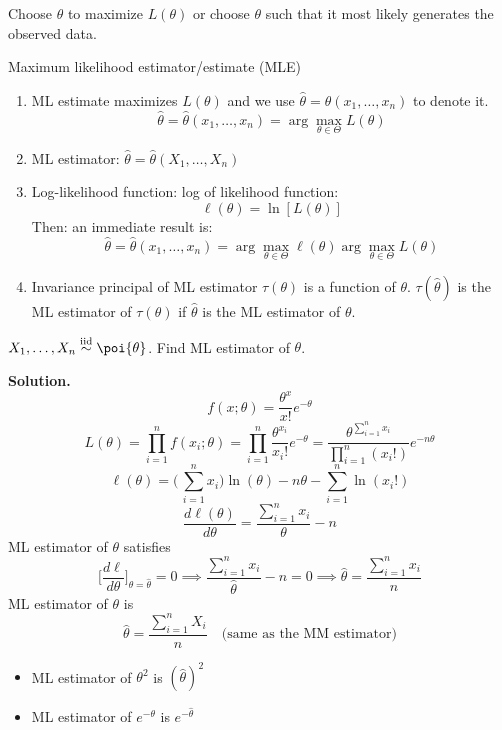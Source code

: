 Choose $ \theta $ to maximize $ L(\theta) $ or choose
$ \theta $ such that it most likely generates the observed data.

Maximum likelihood estimator/estimate (MLE)
\begin{enumerate}
    \item ML estimate maximizes $ L(\theta) $ and we use
          $ \hat{\theta}=\hat{\theta}(x_1,\ldots,x_n) $ to denote it.
          \[ \hat{\theta}=\hat{\theta}(x_1,\ldots,x_n)=
              \arg\max_{\theta\in \Theta}L(\theta) \]
    \item ML estimator: $ \hat{\theta}=\hat{\theta}(X_1,\ldots,X_n) $
    \item Log-likelihood function: log of likelihood function:
          \[ \ell(\theta)=\ln[L(\theta)] \]
          Then: an immediate result is:
          \[ \hat{\theta}=\hat{\theta}(x_1,\ldots,x_n)=
              \arg\max_{\theta\in \Theta}\ell(\theta)
              \arg\max_{\theta\in \Theta}L(\theta) \]
    \item Invariance principal of ML estimator
          $ \tau(\theta) $ is a function of $ \theta $.
          $ \tau(\hat{\theta}) $ is the ML estimator of
          $ \tau(\theta) $ if $ \hat{\theta} $ is the ML
          estimator of $ \theta $.
\end{enumerate}
\begin{Example}{}{}
    $ X_1,\ldots,X_n \stackrel{\text{iid}}{\sim} \poi{\theta} $.
    Find ML estimator of $ \theta $.

    \textbf{Solution.}
    \[ f(x;\theta)=\frac{\theta^x}{x!} e^{-\theta} \]
    \[ L(\theta)=\prod_{i=1}^n f(x_i;\theta)=
        \prod_{i=1}^n \frac{\theta^{x_i}}{x_i!}e^{-\theta}=
        \frac{\theta^{\sum_{i=1}^{n} x_i}}{\prod_{i=1}^n(x_i!)}e^{-n\theta}   \]
    \[ \ell(\theta)=\biggl(\,\sum_{i=1}^{n} x_i\biggr)\ln(\theta)-n \theta-
        \sum_{i=1}^{n} \ln(x_i!) \]
    \[ \frac{d\ell(\theta)}{d\theta}=\frac{\sum_{i=1}^{n} x_i}{\theta}-n   \]
    ML estimator of $ \theta $ satisfies
    \[ \biggl[\frac{d\ell}{d\theta}\biggr]_{\theta=\hat{\theta}}=0\implies
        \frac{\sum_{i=1}^{n} x_i}{\hat{\theta}}-n=0\implies
        \hat{\theta}=\frac{\sum_{i=1}^{n} x_i}{n}   \]
    ML estimator of $ \theta $ is
    \[ \hat{\theta}=\frac{\sum_{i=1}^{n} X_i}{n}\quad\text{(same as the MM estimator)} \]
\end{Example}
\begin{Remark}{}{}
    \begin{itemize}
        \item ML estimator of $ \theta^2 $ is $ (\hat{\theta})^2 $
        \item ML estimator of $ e^{-\theta} $ is $ e^{-\hat{\theta}} $
    \end{itemize}
\end{Remark}
